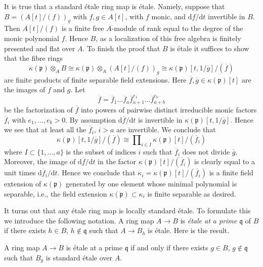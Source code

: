 \noindent
It is true that a standard \'etale ring map is \'etale. Namely, suppose
that $B = \left(A[t]/(f)\right)_g$ with $f, g \in A[t]$, with $f$ monic,
and $\text{d}f/\text{d}t$ invertible in $B$. Then $A[t]/(f)$ is a finite
free $A$-module of rank equal to the degree of the monic polynomial $f$.
Hence $B$, as a localization of this free algebra is finitely presented
and flat over $A$. To finish the proof that $B$ is \'etale it suffices
to show that the fibre rings
$$
\kappa(\mathfrak p) \otimes_A B
\cong
\kappa(\mathfrak p) \otimes_A (A[t]/(f))_g
\cong
\kappa(\mathfrak p)[t, 1/\overline{g}]/(\overline{f})
$$
are finite products of finite separable field extensions.
Here $\overline{f}, \overline{g} \in \kappa(\mathfrak p)[t]$ are
the images of $f$ and $g$. Let
$$
\overline{f} = \overline{f}_1 \ldots \overline{f}_a
\overline{f}_{a + 1}^{e_1} \ldots \overline{f}_{a + b}^{e_b}
$$
be the factorization of $\overline{f}$ into powers of pairwise distinct
irreducible monic factors $\overline{f}_i$ with $e_1, \ldots, e_b > 0$.
By assumption $\text{d}\overline{f}/\text{d}t$ is invertible in
$\kappa(\mathfrak p)[t, 1/\overline{g}]$. Hence we see that
at least all the $\overline{f}_i$, $i > a$ are invertible. We conclude
that
$$
\kappa(\mathfrak p)[t, 1/\overline{g}]/(\overline{f})
\cong
\prod\nolimits_{i \in I} \kappa(\mathfrak p)[t]/(\overline{f}_i)
$$
where $I \subset \{1, \ldots, a\}$ is the subset of indices $i$ such that
$\overline{f}_i$ does not divide $\overline{g}$. Moreover, the image of
$\text{d}\overline{f}/\text{d}t$ in the factor
$\kappa(\mathfrak p)[t]/(\overline{f}_i)$ is clearly equal to a
unit times $\text{d}\overline{f}_i/\text{d}t$. Hence we conclude that
$\kappa_i = \kappa(\mathfrak p)[t]/(\overline{f}_i)$ is a finite field
extension of $\kappa(\mathfrak p)$ generated by one element whose
minimal polynomial is separable, i.e., the field extension
$\kappa(\mathfrak p) \subset \kappa_i$ is finite separable as desired.

\medskip\noindent
It turns out that any \'etale ring map is locally standard \'etale.
To formulate this we introduce the following notation.
A ring map $A \to B$ is {\it \'etale at a prime $\mathfrak q$} of $B$ if there
exists $h \in B$, $h \not \in \mathfrak q$ such that $A \to B_h$ is \'etale.
Here is the result.

\begin{theorem}
\label{theorem-standard-etale}
A ring map $A \to B$ is \'etale at a prime $\mathfrak q$ if and only if there
exists $g \in B$, $g \not \in \mathfrak q$ such that $B_g$ is standard
\'etale over $A$.
\end{theorem}


